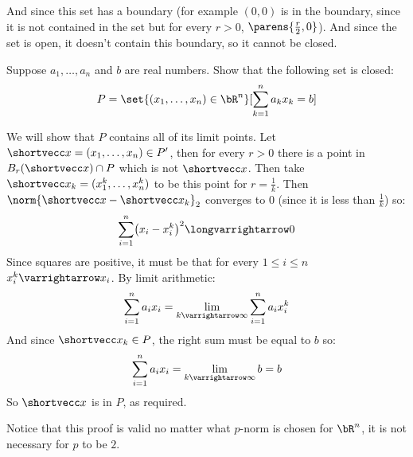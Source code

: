 \documentclass[10pt]{article}
\def\elist{\par\egroup\egroup\medskip}
\begin{document}
\begin{blankpp}
            And since this set has a boundary (for example $(0,0)$ is in the boundary, since it is not contained in the set but for every $r>0$, $\parens{\frac r2,0}$).
            And since the set is open, it doesn't contain this boundary, so it cannot be closed.
    \elist

\end{blankpp}

\begin{exercise*}

    Suppose $a_1,\dots,a_n$ and $b$ are real numbers.
    Show that the following set is closed:
        \[ P = \set{(x_1,\dots,x_n)\in\bR^n}[\sum_{k=1}^n a_kx_k=b] \]

\end{exercise*}

\begin{blankpp}

    We will show that $P$ contains all of its limit points.
    Let $\shortvecc x=(x_1,\dots,x_n)\in P'$, then for every $r>0$ there is a point in $B_r(\shortvecc x)\cap P$ which is not $\shortvecc x$.
    Then take $\shortvecc x_k = (x_1^k,\dots,x_n^k)$ to be this point for $r=\frac1k$.
    Then $\norm{\shortvecc x-\shortvecc x_k}_2$ converges to $0$ (since it is less than $\frac1k$) so:
    \[ \sum_{i=1}^n \bigl(x_i - x_i^k\bigr)^2 \longvarrightarrow 0 \]
    Since squares are positive, it must be that for every $1\leq i\leq n$ $x_i^k\varrightarrow x_i$.
    By limit arithmetic:
    \[ \sum_{i=1}^n a_ix_i = \lim_{k\varrightarrow\infty}\sum_{i=1}^n a_ix_i^k \]
    And since $\shortvecc x_k\in P$, the right sum must be equal to $b$ so:
    \[ \sum_{i=1}^n a_ix_i = \lim_{k\varrightarrow\infty} b = b \]
    So $\shortvecc x$ is in $P$, as required.

    Notice that this proof is valid no matter what $p$-norm is chosen for $\bR^n$, it is not necessary for $p$ to be $2$.

\end{blankpp}
\end{document}
